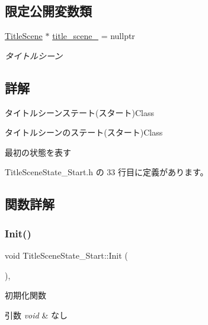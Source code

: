 \subsection*{限定公開変数類}
\begin{DoxyCompactItemize}
\item 
\mbox{\hyperlink{class_title_scene}{Title\+Scene}} $\ast$ \mbox{\hyperlink{class_title_scene_state___start_a1a0dde9e9834cb18e0cf1e1ab12a2129}{title\+\_\+scene\+\_\+}} = nullptr
\begin{DoxyCompactList}\small\item\em タイトルシーン \end{DoxyCompactList}\end{DoxyCompactItemize}


\subsection{詳解}
タイトルシーンステート(スタート)Class 

タイトルシーンのステート(スタート)Class

最初の状態を表す 

 Title\+Scene\+State\+\_\+\+Start.\+h の 33 行目に定義があります。



\subsection{関数詳解}
\mbox{\label{class_title_scene_state___start_a3e785ba088ac3fd0989fd657e5d0cd34}} 
\subsubsection{\texorpdfstring{Init()}{Init()}}
{\footnotesize\ttfamily void Title\+Scene\+State\+\_\+\+Start\+::\+Init (\begin{DoxyParamCaption}{ }\end{DoxyParamCaption})\hspace{0.3cm}{\ttfamily [override]}, {\ttfamily [virtual]}}



初期化関数 


\begin{DoxyParams}{引数}
{\em void} & なし \\
\hline
\end{DoxyParams}

